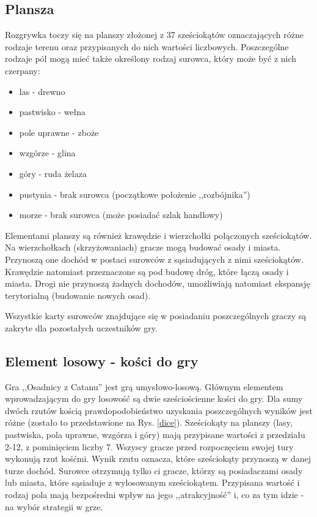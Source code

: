 \documentclass[11pt,twoside]{report}
\providecommand{\imref}[1]{Rys. \ref{#1}} %
\begin{document}
\subsection{Plansza}
Rozgrywka toczy się na planszy złożonej z 37 sześciokątów
oznaczających różne rodzaje terenu oraz przypisanych do nich wartości
liczbowych. Poszczególne rodzaje pól mogą mieć także określony rodzaj
surowca, który może być z nich czerpany:

\begin{itemize}
\item las - drewno
\item pastwisko - wełna
\item pole uprawne - zboże
\item wzgórze - glina
\item góry - ruda żelaza
\item pustynia - brak surowca (początkowe położenie ,,rozbójnika'')
\item morze - brak surowca (może posiadać szlak handlowy)
\end{itemize}

Elementami planszy są również krawędzie i wierzchołki połączonych
sześciokątów. Na wierzchołkach (skrzyżowaniach) gracze mogą budować
osady i miasta. Przynoszą one dochód w postaci surowców z
sąsiadujących z nimi sześciokątów. Krawędzie natomiast przeznaczone są
pod budowę dróg, które łączą osady i miasta. Drogi nie przynoszą
żadnych dochodów, umożliwiają natomiast ekspansję terytorialną
(budowanie nowych osad).

Wszystkie karty surowców znajdujące się w posiadaniu poszczególnych
graczy są zakryte dla pozostałych uczestników gry.

\subsection{Element losowy - kości do gry}
Gra ,,Osadnicy z Catanu'' jest grą umysłowo-losową. Głównym elementem
wprowadzającym do gry losowość są dwie sześciościenne kości do
gry. Dla sumy dwóch rzutów kością prawdopodobieństwo uzyskania
poszczególnych wyników jest różne (zostało to przedstawione na
\imref{dice}). Sześciokąty na planszy (lasy, pastwiska, pola uprawne,
wzgórza i góry) mają przypisane wartości z przedziału 2-12, z
pominięciem liczby 7. Wszyscy gracze przed rozpoczęciem swojej tury
wykonują rzut kośćmi. Wynik rzutu oznacza, które sześciokąty przynoszą
w danej turze dochód. Surowce otrzymują tylko ci gracze, którzy są
posiadaczami osady lub miasta, które sąsiaduje z wylosowanym
sześciokątem. Przypisana wartość i rodzaj pola mają bezpośredni wpływ
na jego ,,atrakcyjność'' i, co za tym idzie - na wybór strategii w
grze.
\end{document}
